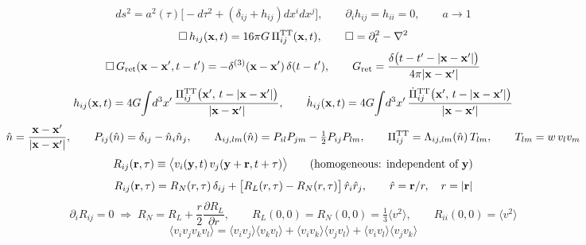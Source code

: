 \documentclass[10pt,prd,aps,nobibnotes,superscriptaddress,preprintnumbers,notitlepage]{revtex4-1}
\def \pa{\partial}
\newcommand{\n}{\hat{n}}
\newcommand{\rhat}{\hat{r}}
\newcommand{\xb}{{\bf x}}
\newcommand{\br}{{\bf r}}
\begin{document}
\begin{equation}
  ds^2=a^2(\tau)\bigl[-d\tau^2+(\delta_{ij}+h_{ij})dx^idx^j\bigr],
  \qquad \pa_ih_{ij}=h_{ii}=0,
  \qquad a\to1
  \label{AR:metric}
\end{equation}
\begin{equation}
  \Box\,h_{ij}(\xb,t)=16\pi G\,\Pi^{\rm TT}_{ij}(\xb,t),
  \qquad \Box=\pa_t^2-\nabla^2
  \label{AR:wave}
\end{equation}
\begin{equation}
  \Box\,G_{\rm ret}(\xb-\xb',t-t')=-\delta^{(3)}(\xb-\xb')\,\delta(t-t'),
  \qquad
  G_{\rm ret}=\frac{\delta\bigl(t-t'-|\xb-\xb'|\bigr)}{4\pi|\xb-\xb'|}
  \label{AR:green}
\end{equation}
\begin{equation}
  h_{ij}(\xb,t)=4G\!\int\!d^3x'\,
  \frac{\Pi^{\rm TT}_{ij}\bigl(\xb',\,t-|\xb-\xb'|\bigr)}{|\xb-\xb'|},
  \qquad
  \dot h_{ij}(\xb,t)=4G\!\int\!d^3x'\,
  \frac{\dot\Pi^{\rm TT}_{ij}\bigl(\xb',\,t-|\xb-\xb'|\bigr)}{|\xb-\xb'|}
  \label{AR:hdot}
\end{equation}
\begin{equation}
  \n=\frac{\xb-\xb'}{|\xb-\xb'|},
  \qquad
  P_{ij}(\n)=\delta_{ij}-\n_i\n_j,
  \qquad
  \Lambda_{ij,lm}(\n)=P_{il}P_{jm}-\tfrac12P_{ij}P_{lm},
  \qquad
  \Pi^{\rm TT}_{ij}=\Lambda_{ij,lm}(\n)\,T_{lm},
  \qquad
  T_{lm}=w\,v_lv_m
  \label{AR:TT}
\end{equation}
\begin{equation}
  R_{ij}(\br,\tau)\equiv\bigl\langle v_i(\mathbf{y},t)\,v_j(\mathbf{y}+\br,t+\tau)\bigr\rangle
  \qquad\text{(homogeneous: independent of }\mathbf{y}\text{)}
  \label{AR:Rij}
\end{equation}
\begin{equation}
  R_{ij}(\br,\tau)=R_N(r,\tau)\,\delta_{ij}
  +\bigl[R_L(r,\tau)-R_N(r,\tau)\bigr]\,\rhat_i\rhat_j,
  \qquad \rhat=\br/r,\quad r=|\br|
  \label{AR:isotropic}
\end{equation}
\begin{equation}
  \pa_iR_{ij}=0
  \;\Longrightarrow\;
  R_N=R_L+\frac{r}{2}\frac{\pa R_L}{\pa r},
  \qquad
  R_L(0,0)=R_N(0,0)=\tfrac13\langle v^2\rangle,
  \qquad
  R_{ii}(0,0)=\langle v^2\rangle
  \label{AR:kh}
\end{equation}
\begin{equation}
  \bigl\langle v_iv_jv_kv_l\bigr\rangle
  =\langle v_iv_j\rangle\langle v_kv_l\rangle
  +\langle v_iv_k\rangle\langle v_jv_l\rangle
  +\langle v_iv_l\rangle\langle v_jv_k\rangle
  \label{AR:wick}
\end{equation}
\end{document}
